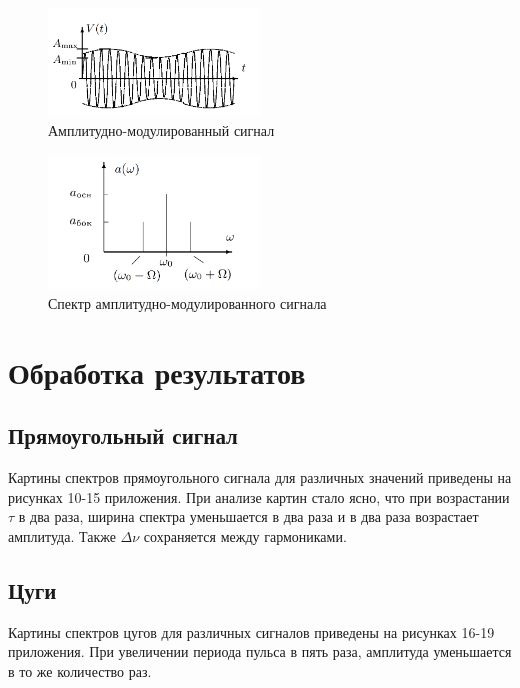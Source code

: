 \documentclass[a4paper, 12pt]{article}
\begin{document}
\begin{figure}[H]
    \centering
    \includegraphics[width=0.5\textwidth]{data/AM.png}
    \caption{Амплитудно-модулированный сигнал}
    \label{fig:data/AM.png}
\end{figure}
\begin{figure}[H]
    \centering
    \includegraphics[width=0.5\textwidth]{data/spAM.png}
    \caption{Спектр амплитудно-модулированного сигнала}
    \label{fig:data/spAM.png}
\end{figure}

\section{Обработка результатов}
\subsection{Прямоугольный сигнал}

Картины спектров прямоугольного сигнала для различных значений приведены на рисунках 10-15 приложения. 
При анализе картин стало ясно, что при возрастании $\tau$ в два раза, ширина спектра уменьшается в два раза и в два раза возрастает амплитуда.
Также $\Delta\nu$ сохраняется между гармониками.

\subsection{Цуги}

Картины спектров цугов для различных сигналов приведены на рисунках 16-19 приложения. При увеличении периода пульса в пять раза, амплитуда уменьшается в то
же количество раз. 
\end{document}
